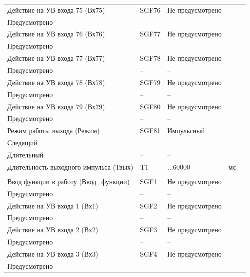 \begin{longtable}{|>{\centering\arraybackslash}m{5.3cm}|>{\centering\arraybackslash}m{3.3cm}|>{\centering\arraybackslash}m{4.2cm}|>{\centering\arraybackslash}m{1.8cm}|>{\centering\arraybackslash}m{1cm}|}
\hline
\centering Действие на УВ входа 75 (Вх75)  & \centering SGF76 & \centering Не предусмотрено \\ Предусмотрено & \centering -- & \centering \arraybackslash -- \\
\hline
\centering Действие на УВ входа 76 (Вх76)  & \centering SGF77 & \centering Не предусмотрено \\ Предусмотрено & \centering -- & \centering \arraybackslash -- \\
\hline
\centering Действие на УВ входа 77 (Вх77)  & \centering SGF78 & \centering Не предусмотрено \\ Предусмотрено & \centering -- & \centering \arraybackslash -- \\
\hline
\centering Действие на УВ входа 78 (Вх78)  & \centering SGF79 & \centering Не предусмотрено \\ Предусмотрено & \centering -- & \centering \arraybackslash -- \\
\hline
\centering Действие на УВ входа 79 (Вх79)  & \centering SGF80 & \centering Не предусмотрено \\ Предусмотрено & \centering -- & \centering \arraybackslash -- \\
\hline
\centering Режим работы выхода (Режим)  & \centering SGF81 & \centering Импульсный \\ Следящий \\ Длительный & \centering -- & \centering \arraybackslash -- \\
\hline
\centering Длительность выходного импульса (Твых)  & \centering T1 & \centering 50...60000 & \centering мс & \centering \arraybackslash 10 \\
\hline
\multicolumn{5}{|c|}{ УВ8 } \\ \hline 
\centering Ввод функции в работу (Ввод\_функции)  & \centering SGF1 & \centering Не предусмотрено \\ Предусмотрено & \centering -- & \centering \arraybackslash -- \\
\hline
\centering Действие на УВ входа 1 (Вх1)  & \centering SGF2 & \centering Не предусмотрено \\ Предусмотрено & \centering -- & \centering \arraybackslash -- \\
\hline
\centering Действие на УВ входа 2 (Вх2)  & \centering SGF3 & \centering Не предусмотрено \\ Предусмотрено & \centering -- & \centering \arraybackslash -- \\
\hline
\centering Действие на УВ входа 3 (Вх3)  & \centering SGF4 & \centering Не предусмотрено \\ Предусмотрено & \centering -- & \centering \arraybackslash -- \\

\end{longtable}
